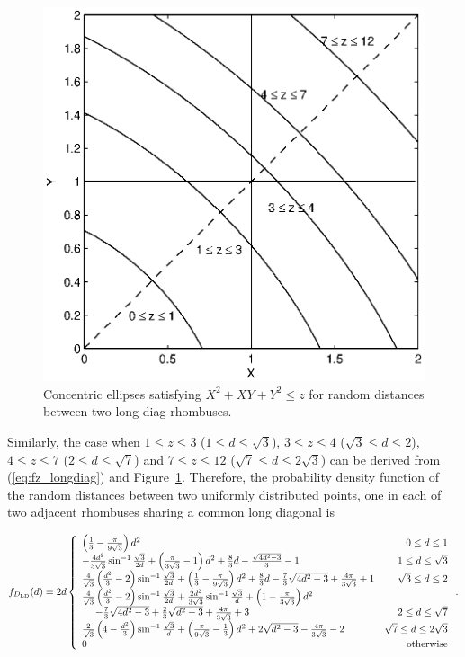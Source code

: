 \documentclass[12pt,draftclsnofoot,onecolumn]{IEEEtran}
\begin{document}
\begin{figure}
  \centering
  \includegraphics[width=0.5\columnwidth]{fig/rhombus_diag1}
  \caption{Concentric ellipses satisfying $X^2+XY+Y^2 \leq z$ for random distances between two long-diag rhombuses.}
  \label{fig:diag1}
\end{figure}

Similarly, the case when $1 \leq z \leq 3$ ($1\leq d\leq \sqrt{3}$),
$3 \leq z \leq 4$ ($\sqrt{3}\leq d\leq 2$), $4 \leq z \leq 7$ ($2\leq d\leq
\sqrt{7}$) and $7 \leq z \leq 12$ ($\sqrt{7}\leq d\leq 2\sqrt{3}$) can
be derived from (\ref{eq:fz_longdiag}) and Figure~\ref{fig:diag1}.
Therefore, the probability density function of the random distances between two
uniformly distributed points, one in each of two adjacent rhombuses sharing
a common long diagonal is
\begin{small}
\begin{equation}\label{eq:fd_r_diag1}
  f_{D_{\rm LD}}(d)=2d\left\{
    \begin{array}{lr}

\left(\frac{1}{3}-\frac{\pi}{9\sqrt{3}}\right)d^2 & 0\leq d\leq 1\\

-\frac{4d^2}{3\sqrt{3}}\sin^{-1}\frac{\sqrt{3}}{2d}+\left(\frac{\pi}{3\sqrt{3}}
-1\right)d^2+\frac{8}{3}d-\frac{\sqrt{4d^2-3}}{3}-1 & 1\leq d\leq \sqrt{3}\\

\frac{4}{\sqrt{3}}\left(\frac{d^2}{3}-2\right)\sin^{-1}\frac{\sqrt{3
}}{2d}+\left(\frac{1}{3}-\frac{\pi}{9\sqrt{3}}\right)d^2+\frac{8}{3}d-\frac{7}{3
}\sqrt{4d^2-3}+\frac{4\pi}{3\sqrt{3}}+1 & \sqrt{3}\leq d\leq 2\\

\frac{4}{\sqrt{3}}\left(\frac{d^2}{3}-2\right)\sin^{-1}\frac{\sqrt{3
}}{2d}+\frac{2d^2}{3\sqrt{3}}\sin^{-1}\frac{\sqrt{3}}{d}+\left(1-\frac{\pi}{
3\sqrt{3}}\right)d^2 \\
~~~~-\frac{7}{3}\sqrt{4d^2-3}+\frac{2}{3}\sqrt{d^2-3}+\frac{4\pi}{3\sqrt{3}}+3 &
2\leq d\leq \sqrt{7} \\

\frac{2}{\sqrt{3}}\left(4-\frac{d^2}{3}\right)\sin^{-1}\frac{\sqrt{3}}{d}
+\left(\frac{\pi}{9\sqrt{3}}-\frac{1}{3}\right)d^2+2\sqrt{d^2-3}-\frac{4\pi}{
3\sqrt{3}}-2 & \sqrt{7} \leq d \leq 2\sqrt{3} \\

      0 & {\rm otherwise}
    \end{array}
  \right..
\end{equation}
\end{small}
\end{document}
